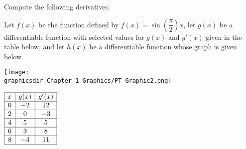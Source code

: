 \begin{questions}
    \question Compute the following derivatives. \\

    
    \horizontalline

    \newpage

    \question Let $f(x)$ be the function defined by $f(x) = \sin \left(\dfrac{\pi}{2}\right)x$, let $g(x)$ be a differentiable function with selected values for $g(x)$ and $g'(x)$ given in the table below, and let $h(x)$ be a differentiable function whose graph is given below. \\
    \begin{minipage}[t]{0.75\textwidth} \vspace{0pt}%
        \texttt{[image: \\graphicsdir Chapter 1 Graphics/PT-Graphic2.png]}
    \end{minipage} \hfill \begin{minipage}[t]{0.2\textwidth} \vspace{11pt}%
        \def\arraystretch{1.4}
        $\begin{array}{|c|c|c|}
            \hline
            x & g(x) & g'(x) \\ \hline
            0 & -2 & 12 \\ \hline
            2 & 0 & -3 \\ \hline
            4 & 5 & 5 \\ \hline
            6 & 3 & 8\\ \hline
            8 & -4 & 11 \\
            \hline
        \end{array}$
    \end{minipage} \\[11pt] 
    

\end{questions}
